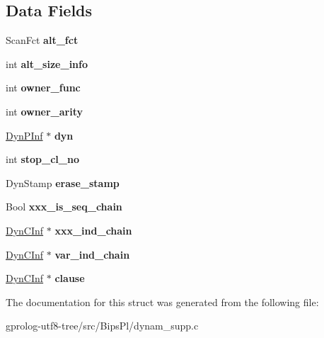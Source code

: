 \subsection*{Data Fields}
\begin{DoxyCompactItemize}
\item 
Scan\+Fct {\bfseries alt\+\_\+fct}\hypertarget{structDynScan_acfa1d047b819d2941ee149649705267a}{}\label{structDynScan_acfa1d047b819d2941ee149649705267a}

\item 
int {\bfseries alt\+\_\+size\+\_\+info}\hypertarget{structDynScan_add62e7961d11ce60357eb13181e762b0}{}\label{structDynScan_add62e7961d11ce60357eb13181e762b0}

\item 
int {\bfseries owner\+\_\+func}\hypertarget{structDynScan_a2e6f2cb912f0477854e0cab2bd4f9f0a}{}\label{structDynScan_a2e6f2cb912f0477854e0cab2bd4f9f0a}

\item 
int {\bfseries owner\+\_\+arity}\hypertarget{structDynScan_a55d99dfd20f733fb1ede548b7accd548}{}\label{structDynScan_a55d99dfd20f733fb1ede548b7accd548}

\item 
\hyperlink{structdynpinf}{Dyn\+P\+Inf} $\ast$ {\bfseries dyn}\hypertarget{structDynScan_a2c4d20f447ace62db674692a4724ce0e}{}\label{structDynScan_a2c4d20f447ace62db674692a4724ce0e}

\item 
int {\bfseries stop\+\_\+cl\+\_\+no}\hypertarget{structDynScan_a786342f885eab9162a783e6633fefa84}{}\label{structDynScan_a786342f885eab9162a783e6633fefa84}

\item 
Dyn\+Stamp {\bfseries erase\+\_\+stamp}\hypertarget{structDynScan_a482a71d0fe57d0a6118a68a1f94e0c4a}{}\label{structDynScan_a482a71d0fe57d0a6118a68a1f94e0c4a}

\item 
Bool {\bfseries xxx\+\_\+is\+\_\+seq\+\_\+chain}\hypertarget{structDynScan_acd70059e162c998780954a78427ad3ee}{}\label{structDynScan_acd70059e162c998780954a78427ad3ee}

\item 
\hyperlink{structdyncinf}{Dyn\+C\+Inf} $\ast$ {\bfseries xxx\+\_\+ind\+\_\+chain}\hypertarget{structDynScan_a657dfdeff11a3a52923f165bcf9bc6fd}{}\label{structDynScan_a657dfdeff11a3a52923f165bcf9bc6fd}

\item 
\hyperlink{structdyncinf}{Dyn\+C\+Inf} $\ast$ {\bfseries var\+\_\+ind\+\_\+chain}\hypertarget{structDynScan_a01058a30b112e62e5768ead8055f6f7f}{}\label{structDynScan_a01058a30b112e62e5768ead8055f6f7f}

\item 
\hyperlink{structdyncinf}{Dyn\+C\+Inf} $\ast$ {\bfseries clause}\hypertarget{structDynScan_ac04b24fb81aec5128d42e5b79123cfc8}{}\label{structDynScan_ac04b24fb81aec5128d42e5b79123cfc8}

\end{DoxyCompactItemize}


The documentation for this struct was generated from the following file\+:\begin{DoxyCompactItemize}
\item 
gprolog-\/utf8-\/tree/src/\+Bips\+Pl/dynam\+\_\+supp.\+c\end{DoxyCompactItemize}
